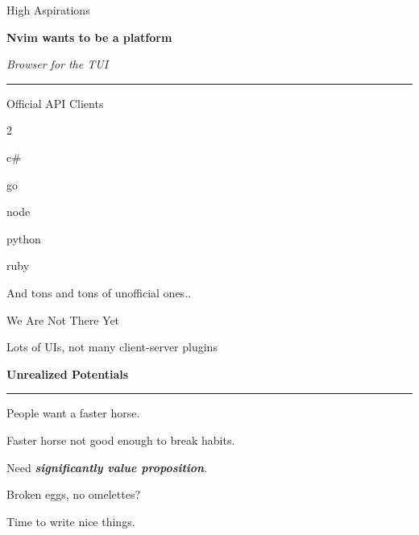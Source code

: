 \documentclass{beamer}
\begin{document}
\begin{frame}{High Aspirations}

	\textbf{Nvim wants to be a platform}

	\textit{Browser for the TUI}

	\rule{\textwidth}{0.1em}

	\hspace{0.1em}

	\begin{block}{Official API Clients}

		\begin{itemize}


		\end{itemize}

	\end{block}

	And tons and tons of unofficial ones..

\end{frame}


\begin{frame}{We Are Not There Yet}

	Lots of UIs, not many client-server plugins

	\textbf{Unrealized Potentials}

	\rule{\textwidth}{0.1em}

	People want a faster horse.

	Faster horse not good enough to break habits.

	\hspace{0.1em}

	Need \textbf{\textit{significantly value proposition}}.

\end{frame}


\begin{frame}[standout]

	Broken eggs, no omelettes?

	Time to write nice things.

\end{frame}
\end{document}
